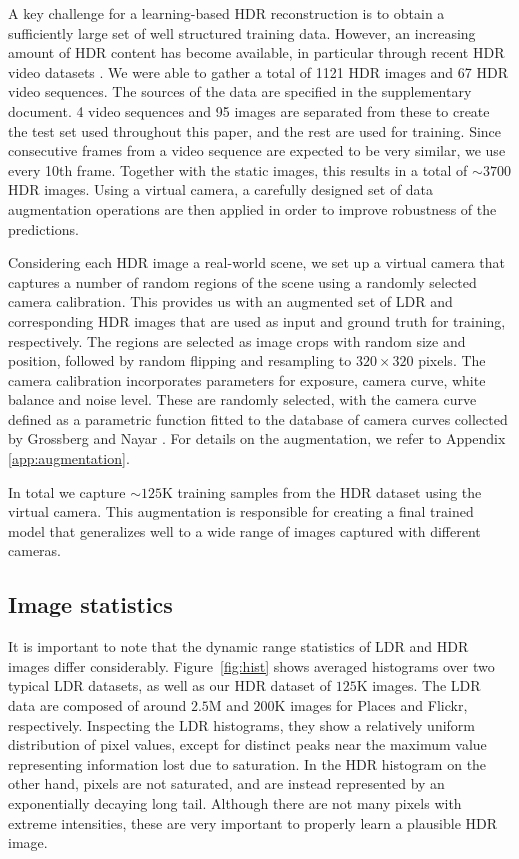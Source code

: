 \documentclass[acmtog]{acmart}
\newcommand{\figref}[1]{Figure~\ref{fig:#1}}
\newcommand\customsection[1]{\subsection{#1}}
\begin{document}
A key challenge for a learning-based HDR reconstruction is to obtain a sufficiently large set of well structured training data.  However, an increasing amount of HDR content has become available, in particular through recent HDR video datasets \cite{Froehlich2014,Kronander2014,Azimi2014,Boitard2014}. We were able to gather a total of 1121 HDR images and 67 HDR video sequences. The sources of the data are specified in the supplementary document. 4 video sequences and 95 images are separated from these to create the test set used throughout this paper, and the rest are used for training. Since consecutive frames from a video sequence are expected to be very similar, we use every 10th frame. Together with the static images, this results in a total of $\sim\!\!3700$ HDR images. Using a virtual camera, a carefully designed set of data augmentation operations are then applied in order to improve robustness of the predictions.

Considering each HDR image a real-world scene, we set up a virtual camera that captures a number of random regions of the scene using a randomly selected camera calibration. This provides us with an augmented set of LDR and corresponding HDR images that are used as input and ground truth for training, respectively. The regions are selected as image crops with random size and position, followed by random flipping and resampling to $320 \times 320$ pixels. The camera calibration incorporates parameters for exposure, camera curve, white balance and noise level. These are randomly selected, with the camera curve defined as a parametric function fitted to the database of camera curves collected by Grossberg and Nayar \citeyear{Grossberg2003}. For details on the augmentation, we refer to Appendix \ref{app:augmentation}.

In total we capture  $\sim\!\!125$K training samples from the HDR dataset using the virtual camera. This augmentation is responsible for creating a final trained model that generalizes well to a wide range of images captured with different cameras.

\customsection{Image statistics} It is important to note that the dynamic range statistics of LDR and HDR images differ considerably. \figref{hist} shows averaged histograms over two typical LDR datasets, as well as our HDR dataset of $125$K images. The LDR data are composed of around $2.5$M and $200$K images for Places \cite{Zhou2014} and Flickr, respectively. Inspecting the LDR histograms, they show a relatively uniform distribution of pixel values, except for distinct peaks near the maximum value representing information lost due to saturation. In the HDR histogram on the other hand, pixels are not saturated, and are instead represented by an exponentially decaying long tail. Although there are not many pixels with extreme intensities, these are very important to properly learn a plausible HDR image. 
\end{document}
